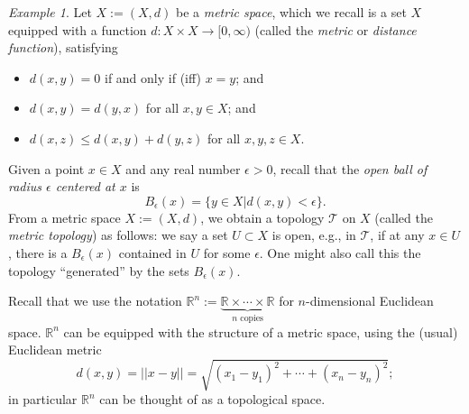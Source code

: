 \documentclass[11pt]{article}
\def\ra{\rightarrow}
\def\R{{\mathbb R}}
\theoremstyle{remark}
\newtheorem{ex}{Example}
\def\T{\mathcal{T}}
\begin{document}
\begin{ex}
    Let $X:=(X, d)$ be a {\em metric space}, which we recall is a set $X$
    equipped with a function $d: X \times X \ra [0, \infty)$ (called the {\em
    metric} or {\em distance function}), satisfying
    \begin{itemize}
        \item $d(x,y) = 0$ if and only if (iff) $x = y$; and
        \item $d(x,y) = d(y,x)$ for all $x,y \in X$; and
        \item $d(x,z) \leq d(x,y) + d(y,z)$ for all $x,y,z \in X$.
    \end{itemize}
    Given a point $x \in X$ and any real number $\epsilon > 0$, recall that the
    {\em open ball of radius $\epsilon$ centered at $x$} is 
    \[
        B_{\epsilon}(x) = \{y \in X | d(x,y) < \epsilon\}.
    \]
    From a metric space $X:=(X,d)$, we obtain a topology $\T$ on $X$ (called
    the {\em metric topology}) as follows: we say a set $U \subset X$ is open,
    e.g., in $\T$, if at any $x \in U$, there is a $B_{\epsilon}(x)$ contained
    in $U$ for some $\epsilon$. One might also call this the topology
    ``generated'' by the sets $B_{\epsilon}(x)$.
\end{ex}
Recall that we use the notation $\R^n := \underbrace{\R \times \cdots \times
\R}_{n\textrm{ copies}}$ for $n$-dimensional Euclidean space. $\R^n$ can be equipped with the structure of a metric space, using the (usual) Euclidean metric
\[
    d(x,y) = ||x-y||= \sqrt{(x_1 - y_1)^2 + \cdots + (x_n - y_n)^2 };
\]
in particular $\R^n$ can be thought of as a topological space. \\
\end{document}
